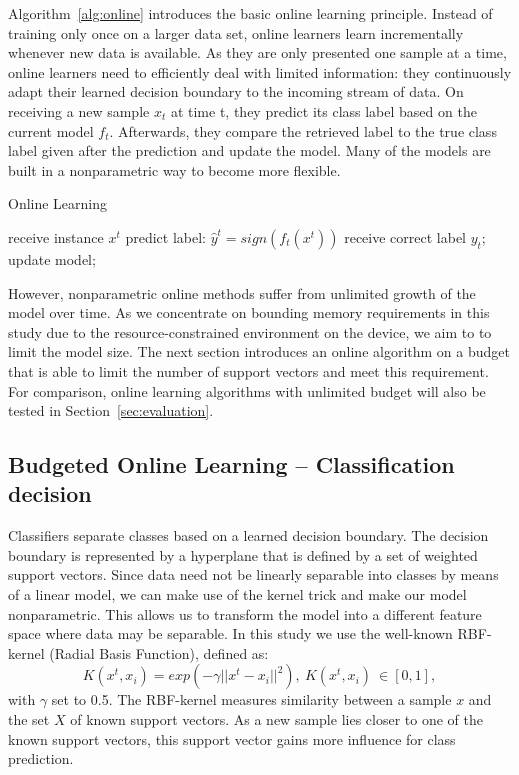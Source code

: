 \documentclass{llncs}
\begin{document}
Algorithm~\ref{alg:online} introduces the basic online learning principle. Instead of training only once on a larger data set, online learners learn incrementally whenever new data is available. As they are only presented one sample at a time, online learners need to efficiently deal with limited information: they continuously adapt their learned decision boundary to the incoming stream of data. On receiving a new sample $x_{t}$ at time t, they predict its class label based on the current model $f_{t}$. Afterwards, they compare the retrieved label to the true class label given after the prediction and update the model. Many of the models are built in a nonparametric way to become more flexible.

 \begin{algorithm}[H]
 	\caption{Online Learning}
 	\label{alg:online}
 	\begin{algorithmic}[1]
 		\State receive instance $x^{t}$
 		\State predict label: $\hat{{y}}^{t} = sign(f_{t}(x^{t}))$
 		\State receive correct label $y_{t}$;
 		\State update model;
 		\EndFor
 	\end{algorithmic}
 \end{algorithm}

However, nonparametric online methods suffer from unlimited growth of the model over time. As we concentrate on bounding memory requirements in this study due to the resource-constrained environment on the device, we aim to to limit the model size. The next section introduces an online algorithm on a budget that is able to limit the number of support vectors and meet this requirement. For comparison, online learning algorithms with unlimited budget will also be tested 
in Section~\ref{sec:evaluation}.



\subsection{Budgeted Online Learning -- Classification decision}
Classifiers separate classes based on a learned decision boundary. The decision boundary is represented by a hyperplane that is defined by a set of weighted support vectors. Since data need not be linearly separable into classes by means of a linear model, we can make use of the kernel trick and make our model nonparametric. This allows us to transform the model into a different feature space where data may be separable. In this study we use the well-known RBF-kernel (Radial Basis Function), defined as:
\begin{equation}\label{eq:kernel}
K(x^{t},x_{i})=exp(-\gamma||x^{t}-x_{i}||^{2}), \: K(x^{t},x_{i})\: \in [0,1],
\end{equation}
with $\gamma$ set to 0.5. The RBF-kernel measures similarity between a sample $x$ and the set $X$ of known support vectors. As a new sample lies closer to one of the known support vectors, this support vector gains more influence for class prediction. \\
\end{document}
